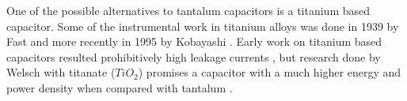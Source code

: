One of the possible alternatives to tantalum capacitors is a titanium based capacitor. Some of the instrumental work in titanium alloys was done in 1939 by Fast \cite{fast1939transition} and more recently in 1995 by Kobayashi \cite{kobayashi1995mechanical}\cite{corwin2013synthesis}. Early work on titanium based capacitors resulted prohibitively high leakage currents \cite{ki2005titanium}, but research done by Welsch \cite{welsch22nd} with titanate ($TiO_2$) promises a capacitor with a much higher energy and power density when compared with tantalum \cite{steve_thesis}.

